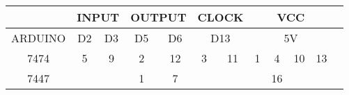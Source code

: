\begin{tabular}{|c|c|c|c|c|c|c|c|c|c|c|c|}
\hline  & \multicolumn{2}{|c|}{INPUT} & \multicolumn{2}{|c|}{OUTPUT} & \multicolumn{2}{|c|}{CLOCK} & \multicolumn{4}{|c|}{VCC} \\
\hline ARDUINO & D2 & D3 & D5 & D6 & \multicolumn{2}{|c|}{D13} & \multicolumn{4}{|c|}{5V} \\
\hline 7474 & 5 & 9 & 2 & 12 & 3 & 11 & 1 & 4 & 10 & 13 \\
\hline 7447 &  &  & 1 & 7 &  &  &  & 16 &  & \\
\hline
\end{tabular}
